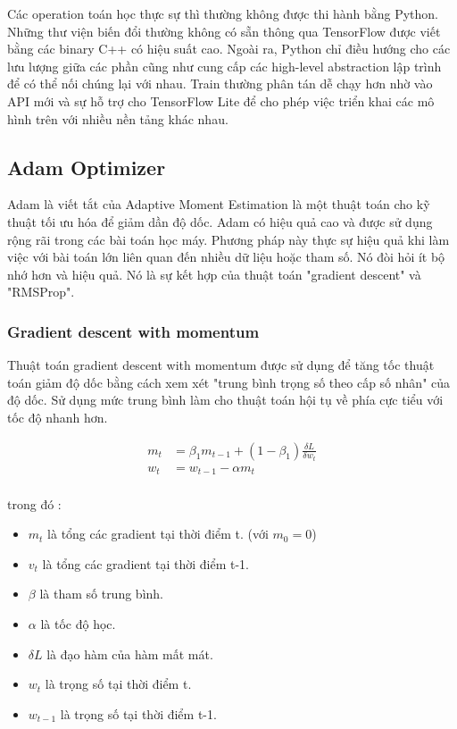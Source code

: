 Các operation toán học thực sự thì thường không được thi hành bằng Python. Những thư viện biến đổi thường không có sẵn thông qua TensorFlow được viết 
bằng các binary C++ có hiệu suất cao.
Ngoài ra, Python chỉ điều hướng cho các lưu lượng giữa các phần cũng như cung cấp các high-level abstraction lập trình để có thể nối chúng lại với nhau. 
Train thường phân tán dễ chạy hơn nhờ vào API mới và sự hỗ trợ cho TensorFlow Lite để cho phép việc triển khai các mô hình trên với nhiều nền tảng khác nhau. 

\subsection{Adam Optimizer}
Adam là viết tắt của Adaptive Moment Estimation là một thuật toán cho kỹ thuật tối ưu hóa để giảm dần độ dốc. Adam có hiệu quả cao và được sử dụng rộng rãi 
trong các bài toán học máy. Phương pháp này thực sự hiệu quả khi làm việc với bài toán lớn liên quan đến nhiều dữ liệu hoặc tham số. Nó đòi hỏi ít bộ nhớ hơn và hiệu quả. 
Nó là sự kết hợp của thuật toán "gradient descent" và "RMSProp".

\subsubsection*{Gradient descent with momentum}
Thuật toán gradient descent with momentum được sử dụng để tăng tốc thuật toán giảm độ dốc bằng cách xem xét "trung bình trọng số theo cấp số nhân" của độ dốc. 
Sử dụng mức trung bình làm cho thuật toán hội tụ về phía cực tiểu với tốc độ nhanh hơn.

\begin{equation}
\begin{aligned}
m_t & = \beta_1 m_{t-1} + (1 - \beta_1) \frac{\delta L}{\delta w_t} \\
w_t & = w_{t-1} - \alpha m_t\\
\end{aligned}
\end{equation}

trong đó :

\begin{itemize}
\item $m_t$ là tổng các gradient tại thời điểm t. (với $m_0 = 0$)
\item $v_t$ là tổng các gradient tại thời điểm t-1.
\item $\beta$ là tham số trung bình.
\item $\alpha$ là tốc độ học.
\item $\delta L$ là đạo hàm của hàm mất mát.
\item $w_t$ là trọng số tại thời điểm t.
\item $w_{t-1}$ là trọng số tại thời điểm t-1.  
\end{itemize}

